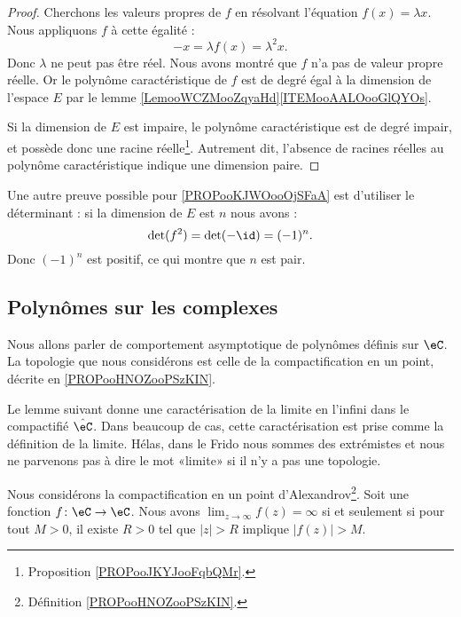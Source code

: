 \begin{proof}
	Cherchons les valeurs propres de \( f\) en résolvant l'équation \( f(x)=\lambda x\). Nous appliquons \( f\) à cette égalité :
	\begin{equation}
		-x=\lambda f(x)=\lambda^2x.
	\end{equation}
	Donc \( \lambda\) ne peut pas être réel. Nous avons montré que \( f\) n'a pas de valeur propre réelle. Or le polynôme caractéristique de \( f\) est de degré égal à la dimension de l'espace \( E\) par le lemme \ref{LemooWCZMooZqyaHd}\ref{ITEMooAALOooGlQYOs}.

	Si la dimension de \( E\) est impaire, le polynôme caractéristique est de degré impair, et possède donc une racine réelle\footnote{Proposition \ref{PROPooJKYJooFqbQMr}.}. Autrement dit, l'absence de racines réelles au polynôme caractéristique indique une dimension paire.
\end{proof}

\begin{normaltext}
	Une autre preuve possible pour \ref{PROPooKJWOooOjSFaA} est d'utiliser le déterminant : si la dimension de \( E\) est \( n\) nous avons :
	\begin{equation}
		\det(f^2)=\det(-\id)=(-1)^n.
	\end{equation}
	Donc \( (-1)^n\) est positif, ce qui montre que \( n\) est pair.
\end{normaltext}

\subsection{Polynômes sur les complexes}

Nous allons parler de comportement asymptotique de polynômes définis sur \( \eC\). La topologie que nous considérons est celle de la compactification en un point, décrite en \ref{PROPooHNOZooPSzKIN}.

Le lemme suivant donne une caractérisation de la limite en l'infini dans le compactifié \( \hat \eC\). Dans beaucoup de cas, cette caractérisation est prise comme la définition de la limite. Hélas, dans le Frido nous sommes des extrémistes et nous ne parvenons pas à dire le mot «limite» si il n'y a pas une topologie.
\begin{lemma}        \label{LEMooERABooQjLBzW}
	Nous considérons la compactification en un point d'Alexandrov\footnote{Définition \ref{PROPooHNOZooPSzKIN}.}. Soit une fonction \( f\colon \eC\to \eC\). Nous avons \( \lim_{z\to \infty} f(z)=\infty\) si et seulement si pour tout \( M>0\), il existe \( R>0\) tel que \( | z |>R\) implique \( | f(z) |>M\).
\end{lemma}

